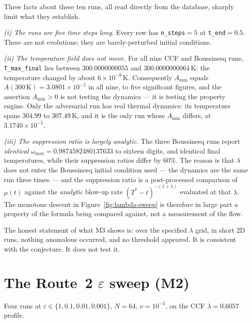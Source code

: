 \begin{obsv}
\label{obs:lambda-caveats}
Three facts about these ten runs, all read directly from the database, sharply
limit what they establish.

\emph{(i) The runs are five time steps long.} Every row has
\texttt{n\_steps}\(=5\) at \texttt{t\_end}\(=0.5\). These are not evolutions;
they are barely-perturbed initial conditions.

\emph{(ii) The temperature field does not move.} For all nine
CCF and Boussinesq runs, \texttt{T\_max\_final} lies between
\(300.0000000055\) and \(300.0000000064\,\mathrm{K}\): the temperature changed
by about \(6\times10^{-9}\,\mathrm{K}\). Consequently \(A_{\min}\) equals
\(A(300\,\mathrm{K})=3.0801\times10^{-5}\) in all nine, to five significant
figures, and the assertion \(A_{\min}>0\) is not testing the dynamics --- it
is testing the property engine. Only the adversarial run has real thermal
dynamics: its temperature spans \(304.99\) to \(307.49\,\mathrm{K}\), and it
is the only run whose \(A_{\min}\) differs, at \(3.1740\times10^{-5}\).

\emph{(iii) The suppression ratio is largely analytic.} The three Boussinesq
runs report \emph{identical} \(\omega_{\max}=0.9874582480137633\) to sixteen
digits, and identical final temperatures, while their suppression ratios
differ by \(60\%\). The reason is that \(\lambda\) does not enter the
Boussinesq initial condition used --- the dynamics are the same run three
times --- and the suppression ratio is a post-processed comparison of
\(\mu(t)\) against the \emph{analytic} blow-up rate \((T^*-t)^{-(1+\lambda)}\)
evaluated at that \(\lambda\). The monotone descent in
Figure~\ref{fig:lambda-sweep} is therefore in large part a property of the
formula being compared against, not a measurement of the flow.

The honest statement of what M3 shows is: over the specified \(\lambda\) grid,
in short 2D runs, nothing anomalous occurred, and no threshold appeared. It is
consistent with the conjecture. It does not test it.
\end{obsv}

\section{The Route~2 \texorpdfstring{\(\varepsilon\)}{eps} sweep (M2)}
\label{sec:route2-2d}

Four runs at \(\varepsilon\in\{1,0.1,0.01,0.001\}\), \(N=64\),
\(\nu=10^{-3}\), on the CCF \(\lambda=0.6057\) profile.

